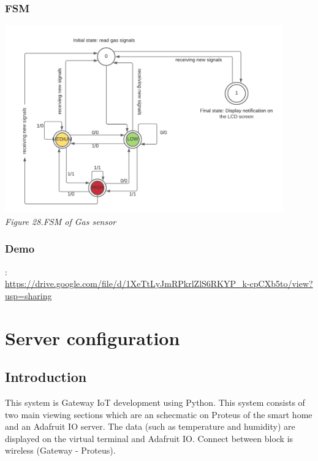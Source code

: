 \documentclass[a4paper]{article}
\begin{document}
\subsubsection{FSM}
\medskip
\begin{center}
    \includegraphics[width=12cm]{pictures/fsm_gas.png}\\
    \textit{Figure 28.FSM of Gas sensor}\\
\end{center}
\medskip
\subsubsection{Demo}
\text{[Source]}:\\
\url{https://drive.google.com/file/d/1XeTtLyJmRPkrlZlS6RKYP_k-cpCXb5to/view?usp=sharing}

\newpage
\section{Server configuration}
\subsection{Introduction}
This system is Gateway IoT development using Python. This system consists of two main viewing
sections which are an schecmatic on Proteus of the smart home and an Adafruit IO server. The data (such as temperature and humidity)
are displayed on the virtual terminal and Adafruit IO. Connect between block is wireless (Gateway
- Proteus).
\end{document}
